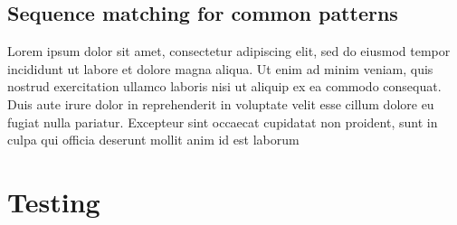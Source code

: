 \subsection{Sequence matching for common patterns}
\label{subsec:ch2sec3sec3}

\par Lorem ipsum dolor sit amet, consectetur adipiscing elit, sed do eiusmod tempor incididunt ut labore et dolore magna aliqua. Ut enim ad minim veniam, quis nostrud exercitation ullamco laboris nisi ut aliquip ex ea commodo consequat. Duis aute irure dolor in reprehenderit in voluptate velit esse cillum dolore eu fugiat nulla pariatur. Excepteur sint occaecat cupidatat non proident, sunt in culpa qui officia deserunt mollit anim id est laborum

\section{Testing}
\label{sec:ch2sec4}

\par 
